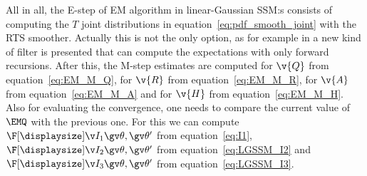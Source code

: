 All in all, the E-step of EM algorithm in linear-Gaussian SSM:s consists of
computing the $T$ joint distributions in equation~\eqref{eq:pdf_smooth_joint} with the RTS smoother.
Actually this is not the only option, as for example in
\textcite{Elliott1999} a new kind of filter is presented that
can compute the expectations with only forward recursions.
After this, the M-step estimates are computed for $\v{Q}$
from equation~\eqref{eq:EM_M_Q}, for $\v{R}$ from equation~\eqref{eq:EM_M_R}, for $\v{A}$ from equation~\eqref{eq:EM_M_A}
and for $\v{H}$ from equation~\eqref{eq:EM_M_H}. Also for evaluating the convergence,
one needs to compare the current value of $\EMQ$ with the previous one.
For this we can compute $\II{1}$ from equation~\eqref{eq:I1},
$\II{2}$ from equation~\eqref{eq:LGSSM_I2} and $\II{3}$ from equation~\eqref{eq:LGSSM_I3}.

% 

